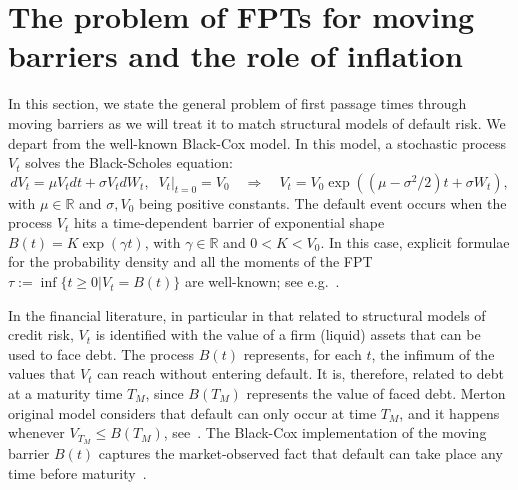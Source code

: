 \documentclass[12pt]{article}
\theoremstyle{definition}
\begin{document}
\section{The problem of FPTs for moving barriers and the role of inflation}
\label{sec:Inflation}

In this section, we state the general problem of first passage times through moving barriers as we will treat it to match structural models of default risk. We depart from the well-known Black-Cox model. In this model, a stochastic process $V_t$ solves the Black-Scholes equation:
$$
dV_t=\mu V_t dt + \sigma V_t dW_t, \;\; \left. V_t \right|_{t=0}= V_0\quad\Rightarrow\quad V_t=V_0\exp((\mu-\sigma^2/2)t+\sigma W_t),
$$
with $\mu \in \mathbb{R}$ and $\sigma, V_0$ being positive constants. The default event occurs when the process $V_t$ hits a time-dependent barrier of exponential shape $B(t)=K\exp(\gamma t)$, with $\gamma \in \mathbb{R}$ and $0<K<V_0$. In this case, explicit formulae for the probability density and all the moments of the FPT $\tau:=\inf\lbrace t\geq 0\vert V_t=B(t)\rbrace$ are well-known; see e.g.~\cite{bielecki2001credit}.

In the financial literature, in particular in that related to structural models of credit risk, $V_t$ is identified with the value of a firm (liquid) assets that can be used to face debt. The process $B(t)$ represents, for each $t$, the infimum of the values that $V_t$ can reach without entering default. It is, therefore, related to debt at a maturity time $T_M$, since $B(T_M)$ represents the value of faced debt. Merton original model considers that default can only occur at time $T_M$, and it happens whenever $V_{T_M} \le B(T_M)$, see~\cite{hull2004merton}. The Black-Cox implementation of the moving barrier $B(t)$ captures the market-observed fact that default can take place any time before maturity~\cite{credit2004bielecki}.
\end{document}
